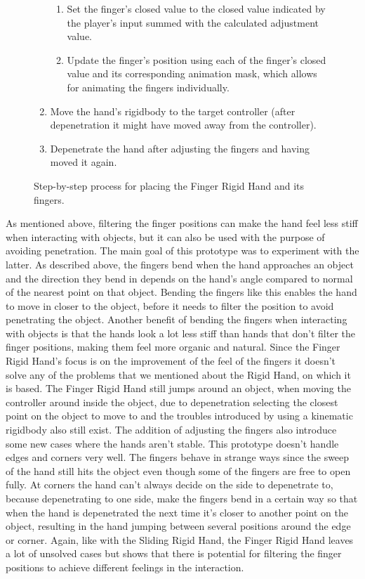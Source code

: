\begin{figure}[H]
\begin{enumerate}[noitemsep]
\begin{enumerate}[noitemsep]
\item Set the finger's closed value to the closed value indicated by the player's input summed with the calculated adjustment value.
\item Update the finger's position using each of the finger's closed value and its corresponding animation mask, which allows for animating the fingers individually.
\end{enumerate}
\item Move the hand's rigidbody to the target controller (after depenetration it might have moved away from the controller).
\item Depenetrate the hand after adjusting the fingers and having moved it again.
\end{enumerate}
\caption{Step-by-step process for placing the Finger Rigid Hand and its fingers.}
\label{fig:stepByStepFingerRigidHand}
\end{figure}

As mentioned above, filtering the finger positions can make the hand feel less stiff when interacting with objects, but it can also be used with the purpose of avoiding penetration. The main goal of this prototype was to experiment with the latter. As described above, the fingers bend when the hand approaches an object and the direction they bend in depends on the hand's angle compared to normal of the nearest point on that object. Bending the fingers like this enables the hand to move in closer to the object, before it needs to filter the position to avoid penetrating the object. Another benefit of bending the fingers when interacting with objects is that the hands look a lot less stiff than hands that don't filter the finger positions, making them feel more organic and natural. Since the Finger Rigid Hand's focus is on the improvement of the feel of the fingers it doesn't solve any of the problems that we mentioned about the Rigid Hand, on which it is based. The Finger Rigid Hand still jumps around an object, when moving the controller around inside the object, due to depenetration selecting the closest point on the object to move to and the troubles introduced by using a kinematic rigidbody also still exist. The addition of adjusting the fingers also introduce some new cases where the hands aren't stable. This prototype doesn't handle edges and corners very well. The fingers behave in strange ways since the sweep of the hand still hits the object even though some of the fingers are free to open fully. At corners the hand can't always decide on the side to depenetrate to, because depenetrating to one side, make the fingers bend in a certain way so that when the hand is depenetrated the next time it's closer to another point on the object, resulting in the hand jumping between several positions around the edge or corner. Again, like with the Sliding Rigid Hand, the Finger Rigid Hand leaves a lot of unsolved cases but shows that there is potential for filtering the finger positions to achieve different feelings in the interaction.

